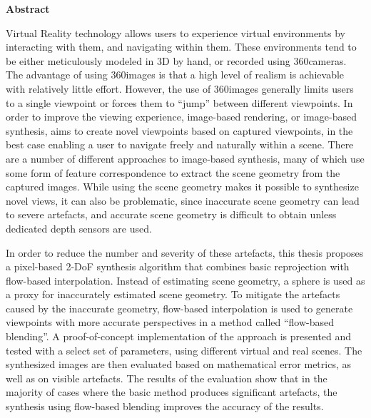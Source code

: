 \vspace*{2cm}

\begin{center}
    \textbf{Abstract}
\end{center}

\vspace*{1cm}

\noindent 
Virtual Reality technology allows users to experience virtual environments by interacting with them, and navigating within them. These environments tend to be either meticulously modeled in 3D by hand, or recorded using 360\degree cameras. The advantage of using 360\degree images is that a high level of realism is achievable with relatively little effort. However, the use of 360\degree images generally limits users to a single viewpoint or forces them to ``jump'' between different viewpoints.
In order to improve the viewing experience, image-based rendering, or image-based synthesis, aims to create novel viewpoints based on captured viewpoints, in the best case enabling a user to navigate freely and naturally within a scene.
There are a number of different approaches to image-based synthesis, many of which use some form of feature correspondence to extract the scene geometry from the captured images.
While using the scene geometry makes it possible to synthesize novel views, it can also be problematic, since inaccurate scene geometry can lead to severe artefacts, and accurate scene geometry is difficult to obtain unless dedicated depth sensors are used.

In order to reduce the number and severity of these artefacts, this thesis proposes a pixel-based 2-DoF synthesis algorithm that combines basic reprojection with flow-based interpolation.
Instead of estimating scene geometry, a sphere is used as a proxy for inaccurately estimated scene geometry.
To mitigate the artefacts caused by the inaccurate geometry, flow-based interpolation is used to generate viewpoints with more accurate perspectives in a method called ``flow-based blending''.
A proof-of-concept implementation of the approach is presented and tested with a select set of parameters, using different virtual and real scenes.
The synthesized images are then evaluated based on mathematical error metrics, as well as on visible artefacts. The results of the evaluation show that in the majority of cases where the basic method produces significant artefacts, the synthesis using flow-based blending improves the accuracy of the results.

